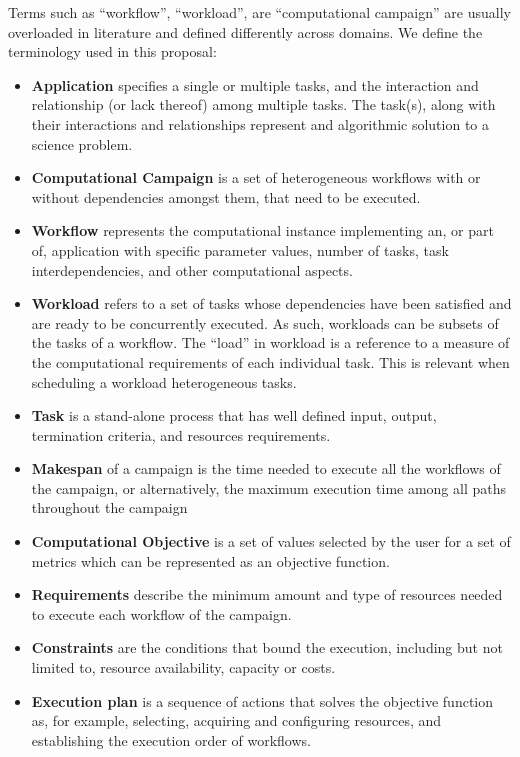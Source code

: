 \label{definitions}
Terms such as ``workflow'', ``workload'', are ``computational campaign'' are usually overloaded in literature and defined differently across domains. We define the terminology used in this proposal:
\begin{itemize}
    \item \textbf{Application} specifies a single or multiple tasks, and the interaction and relationship (or lack thereof) among multiple tasks. The task(s), along with their interactions and relationships represent and algorithmic solution to a science problem.
    \item \textbf{Computational Campaign} is a set of heterogeneous workflows with or without dependencies amongst them, that need to be executed.
    \item \textbf{Workflow} represents the computational instance implementing an, or part of, application with specific parameter values, number of tasks, task interdependencies, and other computational aspects.
    \item \textbf{Workload} refers to a set of tasks whose dependencies have been satisfied and are ready to be concurrently executed. As such, workloads can be subsets of the tasks of a workflow. The “load” in workload is a reference to a measure of the computational requirements of each individual task. This is relevant when scheduling a workload heterogeneous tasks.
    \item \textbf{Task} is a stand-alone process that has well defined input, output, termination criteria, and resources requirements.
    \item \textbf{Makespan} of a campaign is the time needed to execute all the workflows of the campaign, or alternatively, the maximum execution time among all paths throughout the campaign~\cite{chirkin2017execution}
    \item \textbf{Computational Objective} is a set of values selected by the user for a set of metrics which can be represented as an objective function.
    \item \textbf{Requirements} describe the minimum amount and type of resources needed to execute each workflow of the campaign.
    \item \textbf{Constraints} are the conditions that bound the execution, including but not limited to, resource availability, capacity or costs.
    \item \textbf{Execution plan} is a sequence of actions that solves the objective function as, for example, selecting, acquiring and configuring resources, and establishing the execution order of workflows.

\end{itemize}
